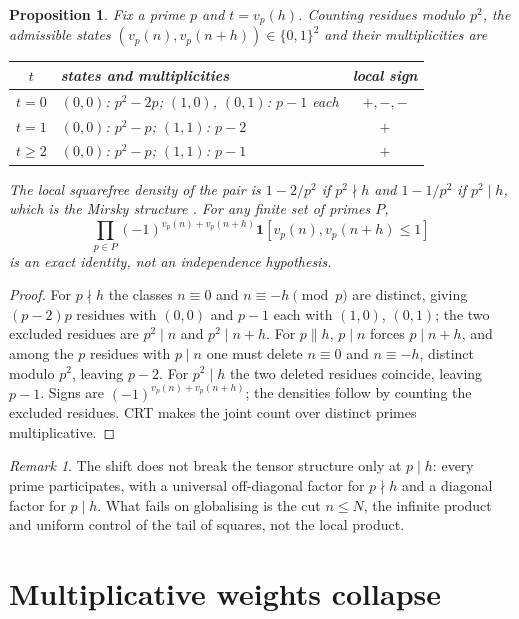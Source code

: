 \documentclass[11pt]{amsart}
\numberwithin{equation}{section}
\theoremstyle{plain}
\newtheorem{proposition}[theorem]{Proposition}
\theoremstyle{definition}
\theoremstyle{remark}
\newtheorem{remark}[theorem]{Remark}
\begin{document}
\begin{proposition}
\label{prop:local_tables}
Fix a prime $p$ and $t=v_p(h)$. Counting residues modulo $p^2$, the
admissible states $(v_p(n),v_p(n+h))\in\{0,1\}^2$ and their
multiplicities are
\begin{center}
\begin{tabular}{c|l|c}
$t$ & states and multiplicities & local sign\\ \hline
$t=0$ & $(0,0)$: $p^2-2p$; $(1,0)$, $(0,1)$: $p-1$ each & $+,-,-$\\
$t=1$ & $(0,0)$: $p^2-p$; $(1,1)$: $p-2$ & $+$\\
$t\ge2$ & $(0,0)$: $p^2-p$; $(1,1)$: $p-1$ & $+$
\end{tabular}
\end{center}
The local squarefree density of the pair is $1-2/p^2$ if $p^2\nmid h$
and $1-1/p^2$ if $p^2\mid h$, which is the Mirsky structure
\cite{Mirsky1949}. For any finite set of primes $P$,
\begin{equation}
\prod_{p\in P}(-1)^{v_p(n)+v_p(n+h)}
\mathbf 1[v_p(n),v_p(n+h)\le1]
\label{eq:local_identity}
\end{equation}
is an exact identity, not an independence hypothesis.
\end{proposition}

\begin{proof}
For $p\nmid h$ the classes $n\equiv0$ and $n\equiv-h\pmod p$ are
distinct, giving $(p-2)p$ residues with $(0,0)$ and $p-1$ each with
$(1,0)$, $(0,1)$; the two excluded residues are $p^2\mid n$ and
$p^2\mid n+h$. For $p\|h$, $p\mid n$ forces $p\mid n+h$, and among the
$p$ residues with $p\mid n$ one must delete $n\equiv0$ and
$n\equiv-h$, distinct modulo $p^2$, leaving $p-2$. For $p^2\mid h$ the
two deleted residues coincide, leaving $p-1$. Signs are
$(-1)^{v_p(n)+v_p(n+h)}$; the densities follow by counting the excluded
residues. CRT makes the joint count over distinct primes multiplicative.
\end{proof}

\begin{remark}
\label{rem:local_is_not_the_obstruction}
The shift does not break the tensor structure only at $p\mid h$: every
prime participates, with a universal off-diagonal factor for $p\nmid h$
and a diagonal factor for $p\mid h$. What fails on globalising is the
cut $n\le N$, the infinite product and uniform control of the tail of
squares, not the local product.
\end{remark}

\section{Multiplicative weights collapse}
\label{sec:collapse}
\end{document}
